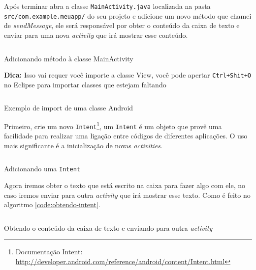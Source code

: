 \documentclass[a4paper,12pt,brazil]{book}
\begin{document}
\begin{singlespace}
Após terminar abra a classe \texttt{MainActivity.java} localizada na pasta \texttt{src/com.example.meuapp/} do seu projeto e adicione um novo método que chamei de \emph{sendMessage}, ele será responsável por obter o conteúdo da caixa de texto e enviar para uma nova \emph{activity} que irá mostrar esse conteúdo.

\begin{listing}
\inputminted[linenos=true,fontsize=\small,frame=lines, framesep=2mm, tabsize=2,numbersep=5pt]{java}{src/firstapp/4.java}
\caption{Adicionando método à classe MainActivity}
\end{listing}

\begin{framed}
\textbf{Dica:} Isso vai requer você importe a classe View, você pode apertar \texttt{Ctrl+Shit+O} no Eclipse para importar classes que estejam faltando
\end{framed}

\begin{listing}
\inputminted[linenos=true,fontsize=\small,frame=lines, framesep=2mm, tabsize=2,numbersep=5pt]{java}{src/firstapp/4-2.java}
\caption{Exemplo de import de uma classe Android}
\end{listing}

Primeiro, crie um novo \texttt{Intent}\footnote{Documentação Intent: \href{http://developer.android.com/reference/android/content/Intent.html}{http://developer.android.com/reference/android/content/Intent.html}}, um \texttt{Intent} é um objeto que provê uma facilidade para realizar uma ligação entre códigos de diferentes aplicações. O uso mais significante é a inicialização de novas \emph{activities}.

\begin{listing}[H]
\inputminted[linenos=true,fontsize=\small,frame=lines, framesep=2mm, tabsize=2,numbersep=5pt]{java}{src/firstapp/5.java}
\caption{Adicionando uma \texttt{Intent}}
\label{code:obtendo-intent}
\end{listing}

Agora iremos obter o texto que está escrito na caixa para fazer algo com ele, no caso iremos enviar para outra \emph{activity} que irá mostrar esse texto. Como é feito no algoritmo \ref{code:obtendo-intent}.

\begin{listing}[H]
\inputminted[linenos=true,fontsize=\small,frame=lines, framesep=2mm, tabsize=2,numbersep=5pt]{java}{src/firstapp/6.java}
\caption{Obtendo o conteúdo da caixa de texto e enviando para outra \emph{activity}}
\end{listing}


\end{singlespace}
\end{document}
